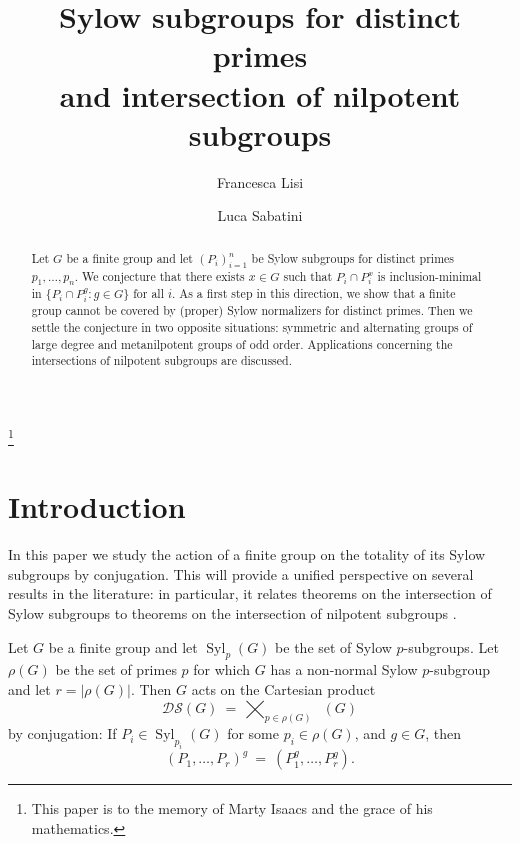 \documentclass[11pt]{amsart}
\author[Francesca Lisi]{Francesca Lisi}
\author[Luca Sabatini]{Luca Sabatini}
\title[Sylow subgroups for distinct primes]{Sylow subgroups for distinct primes\\and intersection of nilpotent subgroups}
\numberwithin{equation}{section}
\theoremstyle{definition}
\theoremstyle{remark}
\newcommand{\Syl}{\mathop{\mathrm{Syl}}}
\newcommand{\Sylp}{\mathop{\mathrm{Syl}_p}}
\newcommand{\DS}{\mathcal{DS}}
\newcommand\blfootnote[1]{%
  \begingroup
  \renewcommand\thefootnote{}\footnote{#1}%
  \addtocounter{footnote}{-1}%
  \endgroup
}
\begin{document}
 

 
\maketitle 

\blfootnote{This paper is to the memory of Marty Isaacs and the grace of his mathematics.}

\begin{abstract} 
Let $G$ be a finite group and let $(P_i)_{i=1}^n$ be Sylow subgroups for distinct primes $p_1,\ldots,p_n$.
We conjecture that there exists $x \in G$ such that $P_i \cap P_i^x$ is inclusion-minimal
in $\{ P_i \cap P_i^g : g \in G\}$ for all $i$.
As a first step in this direction,
we show that a finite group cannot be covered by (proper) Sylow normalizers for distinct primes.
Then we settle the conjecture in two opposite situations:
symmetric and alternating groups of large degree and metanilpotent groups of odd order.
Applications concerning the intersections of nilpotent subgroups are discussed.
\end{abstract}



\vspace{0.5cm}
\section{Introduction} \label{sec1}

In this paper we study the action of a finite group on the totality of its Sylow subgroups by conjugation.
This will provide a unified perspective on several results in the literature:
in particular, it relates theorems on the intersection of Sylow subgroups
\cite{Bro63,DGG+25,Ebe25,Ito58,Man75,MZ96,Rob84}
to theorems on the intersection of nilpotent subgroups
\cite{Bia75,Her71,Kur13,Pas66,Zen94,Zen96}.

Let $G$ be a finite group and let $\Syl_p(G)$ be the set of Sylow $p$-subgroups.
Let $\rho(G)$ be the set of primes $p$ for which $G$ has a non-normal Sylow $p$-subgroup and let $r=|\rho(G)|$.
Then $G$ acts on the Cartesian product
$$ \DS(G) \> = \> \bigtimes_{p \in \rho(G)} \Sylp(G) $$
by conjugation: If $P_i \in \Syl_{p_i}(G)$ for some $p_i \in \rho(G)$, and $g \in G$,
then
$$ (P_1,\ldots,P_r)^g \> = \> (P_1^g,\ldots,P_r^g) . $$
\end{document}
